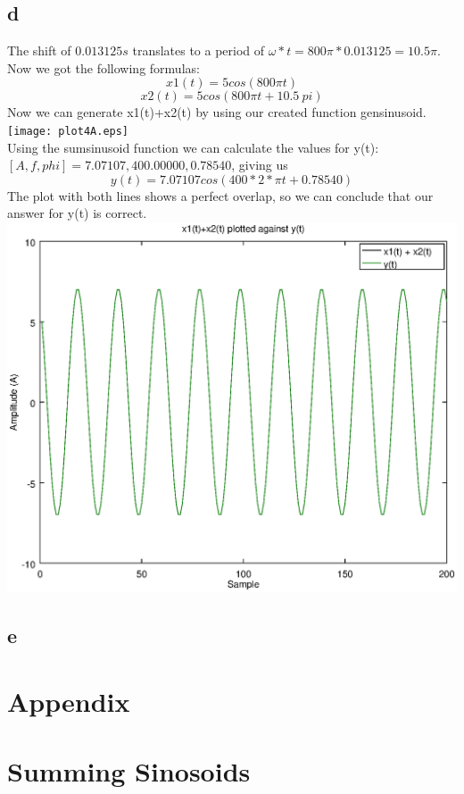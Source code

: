 \documentclass[10pt]{article}
\begin{document}
\subsection{d}
The shift of $0.013125s$ translates to a period of $\omega * t = 800\pi*0.013125 = 10.5\pi$.
Now we got the following formulas:
\begin{equation}
    x1(t) = 5 cos(800\pi t)
\end{equation}
\begin{equation}
    x2(t) = 5 cos(800\pi t + 10.5\:pi)
\end{equation}
Now we can generate x1(t)+x2(t) by using our created function gensinusoid.\\
\texttt{[image: plot4A.eps]}\\
Using the sumsinusoid function we can calculate the values for y(t):
$[A, f, phi] = 7.07107,400.00000,0.78540$, giving us\
\begin{equation}
    y(t) = 7.07107 cos(400*2*\pi t + 0.78540)
\end{equation}
The plot with both lines shows a perfect overlap,
so we can conclude that our answer for y(t) is correct.
\includegraphics[width=\columnwidth]{plot4B.eps}

\subsection{e}


\newpage
\section*{Appendix}
\appendix
\section{Summing Sinosoids}
\end{document}
